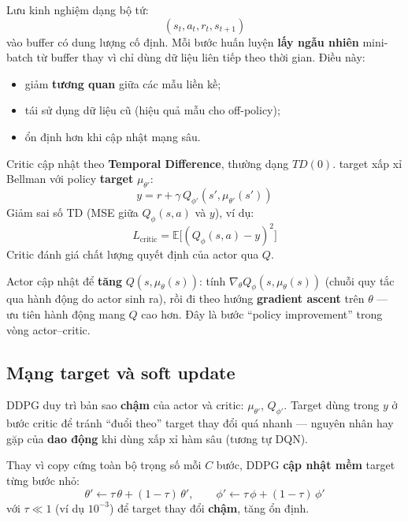 \begin{phuongphap}[title={Experience replay}]
Lưu kinh nghiệm dạng bộ tứ:
\[
(s_t, a_t, r_t, s_{t+1})
\]
vào buffer có dung lượng cố định. Mỗi bước huấn luyện \textbf{lấy ngẫu nhiên} mini-batch từ buffer thay vì chỉ dùng dữ liệu liên tiếp theo thời gian. Điều này:
\begin{itemize}
  \item giảm \textbf{tương quan} giữa các mẫu liền kề;
  \item tái sử dụng dữ liệu cũ (hiệu quả mẫu cho off-policy);
  \item ổn định hơn khi cập nhật mạng sâu.
\end{itemize}
\end{phuongphap}

\begin{phuongphap}[title={Huấn luyện Critic (TD)}]
Critic cập nhật theo \textbf{Temporal Difference}, thường dạng $TD(0)$. target xấp xỉ Bellman với policy \textbf{target} $\mu_{\theta'}$:
\[
y = r + \gamma\, Q_{\phi'}(s', \mu_{\theta'}(s'))
\]
Giảm sai số TD (MSE giữa $Q_\phi(s,a)$ và $y$), ví dụ:
\[
L_{\text{critic}} = \mathbb{E}\big[(Q_\phi(s,a) - y)^2\big]
\]
Critic đánh giá chất lượng quyết định của actor qua $Q$.
\end{phuongphap}

\begin{phuongphap}[title={Huấn luyện Actor (gradient ascent trên Q)}]
Actor cập nhật để \textbf{tăng} $Q(s, \mu_\theta(s))$: tính $\nabla_\theta Q_\phi(s, \mu_\theta(s))$ (chuỗi quy tắc qua hành động do actor sinh ra), rồi đi theo hướng \textbf{gradient ascent} trên $\theta$ --- ưu tiên hành động mang $Q$ cao hơn. Đây là bước ``policy improvement'' trong vòng actor--critic.
\end{phuongphap}

\subsection{Mạng target và soft update}

\begin{ynghia}[title={Mạng target}]
DDPG duy trì bản sao \textbf{chậm} của actor và critic: $\mu_{\theta'}$, $Q_{\phi'}$. Target dùng trong $y$ ở bước critic để tránh ``đuổi theo'' target thay đổi quá nhanh --- nguyên nhân hay gặp của \textbf{dao động} khi dùng xấp xỉ hàm sâu (tương tự DQN).
\end{ynghia}

\begin{phuongphap}[title={Soft update (Polyak averaging)}]
Thay vì copy cứng toàn bộ trọng số mỗi $C$ bước, DDPG \textbf{cập nhật mềm} target từng bước nhỏ:
\[
\theta' \leftarrow \tau\,\theta + (1-\tau)\,\theta', \qquad
\phi' \leftarrow \tau\,\phi + (1-\tau)\,\phi'
\]
với $\tau \ll 1$ (ví dụ $10^{-3}$) để target thay đổi \textbf{chậm}, tăng ổn định.
\end{phuongphap}

